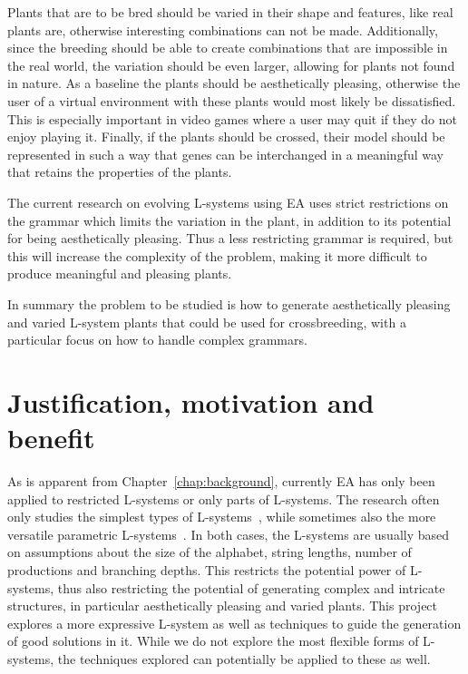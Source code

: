 Plants that are to be bred should be varied in their shape and features, like real plants are, otherwise interesting combinations can not be made.
Additionally, since the breeding should be able to create combinations that are impossible in the real world, the variation should be even larger, allowing for plants not found in nature.
As a baseline the plants should be aesthetically pleasing, otherwise the user of a virtual environment with these plants would most likely be dissatisfied.
This is especially important in video games where a user may quit if they do not enjoy playing it.
Finally, if the plants should be crossed, their model should be represented in such a way that genes can be interchanged in a meaningful way that retains the properties of the plants.

The current research on evolving \glspl{L-system} using \gls{EA} uses strict restrictions on the grammar which limits the variation in the plant, in addition to its potential for being aesthetically pleasing. %
Thus a less restricting grammar is required, but this will increase the complexity of the problem, making it more difficult to produce meaningful and pleasing plants.

In summary the problem to be studied is how to generate aesthetically pleasing and varied \gls{L-system} plants that could be used for crossbreeding, with a particular focus on how to handle complex grammars.

\section{Justification, motivation and benefit}
As is apparent from Chapter~\ref{chap:background}, currently \gls{EA} has only been applied to restricted L-systems or only parts of L-systems.
The research often only studies the simplest types of L-systems~\cite{1998Mock,1998Ochoa,2002Ebner,2003Ebner,2006Ashlock,2009Beaumont,2009Corchado}, while sometimes also the more versatile parametric L-systems~\cite{1994Jacob,2000Vanak,2001Hornby}.
In both cases, the L-systems are usually based on assumptions about the size of the alphabet, string lengths, number of productions and branching depths.
This restricts the potential power of L-systems, thus also restricting the potential of generating complex and intricate structures, in particular aesthetically pleasing and varied plants.
This project explores a more expressive L-system as well as techniques to guide the generation of good solutions in it.
While we do not explore the most flexible forms of L-systems, the techniques explored can potentially be applied to these as well.

